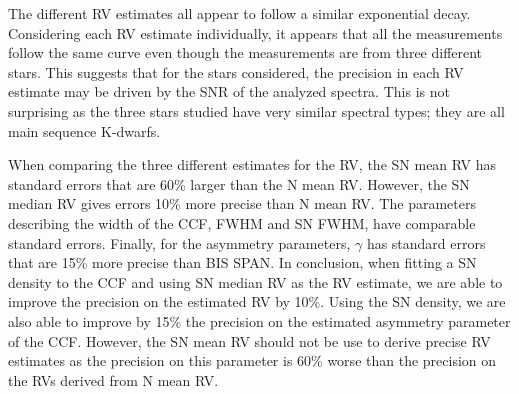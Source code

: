 \documentclass{aa}
\begin{document}
The different RV estimates all appear to follow a similar exponential decay. Considering each RV estimate individually, it appears that all the measurements follow the same curve even though the measurements are from three different stars. This suggests that for the stars considered, the precision in each RV estimate may be driven by the SNR of the analyzed spectra. 
This is not surprising as the three stars studied have very similar spectral types; they are all main sequence K-dwarfs. 

When comparing the three different estimates for the RV, the SN mean RV has standard errors that are 60\% larger than the N mean RV. However, the SN median RV gives errors 10\% more precise than N mean RV. 
The parameters describing the width of the CCF, FWHM and SN FWHM, have comparable standard errors. 
Finally, for the asymmetry parameters, $\gamma$ has standard errors that are 15\% more precise than BIS SPAN. 
In conclusion, when fitting a SN density to the CCF and using SN median RV as the RV estimate, we are able to improve the precision on the estimated RV by 10\%. Using the SN density, we are also able to improve by 15\% the precision on the estimated asymmetry parameter of the CCF.  However, the SN mean RV should not be use to derive precise RV estimates
as the precision on this parameter is 60\% worse than the precision on the RVs derived from N mean RV.
%
\end{document}
